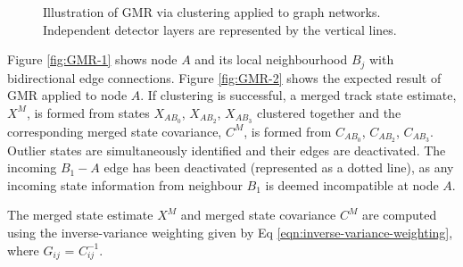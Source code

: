 \begin{figure}[htbp!] 
    \centering
    \hfill%
    \caption{Illustration of GMR via clustering applied to graph networks. Independent detector layers are represented by the vertical lines.}
    \label{fig:GMR-example}
\end{figure}


Figure \ref{fig:GMR-1} shows node $A$ and its local neighbourhood $B_j$ with bidirectional edge connections. Figure \ref{fig:GMR-2} shows the expected result of GMR applied to node $A$. If clustering is successful, a merged track state estimate, $X^M$, is formed from states $X_{AB_0}$, $X_{AB_2}$, $X_{AB_3}$ clustered together and the corresponding merged state covariance, $C^M$, is formed from $C_{AB_0}$, $C_{AB_2}$, $C_{AB_3}$. Outlier states are simultaneously identified and their edges are deactivated. The incoming $B_1 - A$ edge has been deactivated (represented as a dotted line), as any incoming state information from neighbour $B_1$ is deemed incompatible at node $A$.

The merged state estimate $X^{M}$ and merged state covariance $C^{M}$ are computed using the inverse-variance weighting \cite{inverse-variance-weighting} given by Eq \eqref{eqn:inverse-variance-weighting}, where $G_{ij}$ = $C_{ij}^{-1}$.

